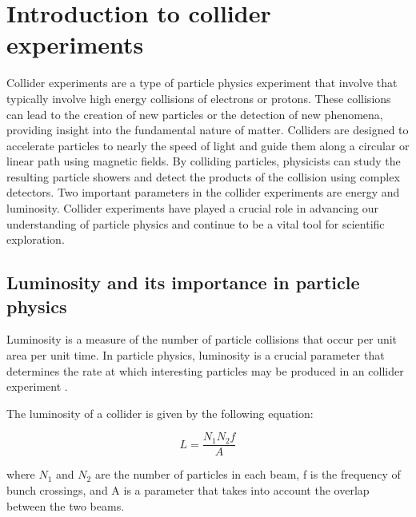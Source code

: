 \chapter{Introduction to collider experiments}  %

\ifpdf
    \graphicspath{{Chapter1/Figs/Raster/}{Chapter1/Figs/PDF/}{Chapter1/Figs/}}
\else
    \graphicspath{{Chapter1/Figs/Vector/}{Chapter1/Figs/}}
\fi


Collider experiments are a type of particle physics experiment that involve that typically involve high energy collisions of electrons or protons. %
These collisions can lead to the creation of new particles or the detection of new phenomena, providing insight into the fundamental nature of matter. Colliders are designed to accelerate particles to nearly the speed of light and guide them along a circular or linear path using magnetic fields. By colliding particles, physicists can study the resulting particle showers and detect the products of the collision using complex detectors. Two important parameters in the collider experiments are energy and luminosity. Collider experiments have played a crucial role in advancing our understanding of particle physics and continue to be a vital tool for scientific exploration. 

\section{Luminosity and its importance in particle physics}

Luminosity is a measure of the number of particle collisions that occur per unit area per unit time. In particle physics, luminosity is a crucial parameter that determines the rate at which interesting particles may be produced in an collider experiment \cite{Herr:941318}.

The luminosity of a collider is given by the following equation:

\begin{equation}
L = \frac{N_1 N_2 f}{A} 
\end{equation}

where $N_1$ and $N_2$ are the number of particles in each beam, f is the frequency of bunch crossings, and A is a parameter that takes into account the overlap between the two beams.

